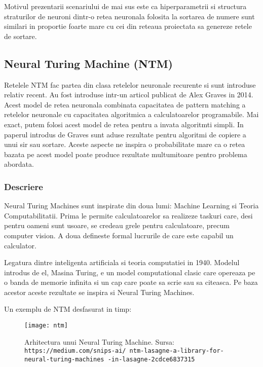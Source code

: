 \documentclass[12pt]{article}
\begin{document}
Motivul prezentarii scenariului de mai sus este ca hiperparametrii si structura straturilor de neuroni dintr-o retea neuronala folosita la sortarea de numere sunt similari in proportie foarte mare cu cei din reteaua proiectata sa genereze retele de sortare.

\subsection{Neural Turing Machine (NTM)}

Retelele NTM fac partea din clasa retelelor neuronale recurente si sunt introduse relativ recent. Au fost introduse intr-un articol publicat de Alex Graves in 2014. Acest model de retea neuronala combinata capacitatea de pattern matching a retelelor neuronale cu capacitatea algoritmica a calculatoarelor programabile. Mai exact, putem folosi acest model de retea pentru a invata algoritmti simpli. In paperul introdus de Graves sunt aduse rezultate pentru algoritmi de copiere a unui sir sau sortare. Aceste aspecte ne inspira o probabilitate mare ca o retea bazata pe acest model poate produce rezultate multumitoare pentro problema abordata.

\subsubsection{Descriere}

Neural Turing Machines sunt inspirate din doua lumi: Machine Learning si Teoria Computabilitatii. Prima le permite calculatoarelor sa realizeze taskuri care, desi pentru oameni sunt usoare, se credeau grele pentru calculatoare, precum computer vision. A doua defineste formal lucrurile de care este capabil un calculator. 

Legatura dintre inteligenta artificiala si teoria computatiei in 1940. Modelul introdus de el, Masina Turing, e un model computational clasic care opereaza pe o banda de memorie infinita si un cap care poate sa scrie sau sa citeasca. Pe baza acestor aceste rezultate se inspira si Neural Turing Machines.

Un exemplu de NTM desfasurat in timp:


\begin{figure}
\centering
\texttt{[image: ntm]}
\\
\caption{Arhitectura unui Neural Turing Machine. Sursa: \texttt{https://medium.com/snips-ai/
ntm-lasagne-a-library-for-neural-turing-machines
-in-lasagne-2cdce6837315}}
\end{figure}
\end{document}
